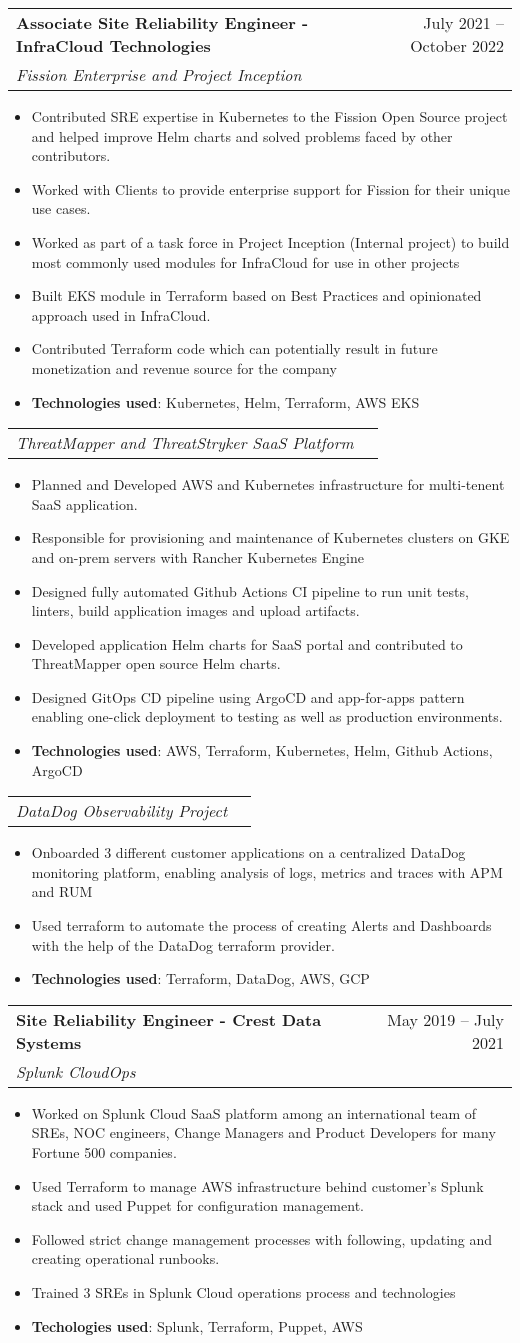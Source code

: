 \documentclass[letterpaper,11pt]{article}
\makeatletter
\newcommand{\resumeItem}[1]{
  \item\small{
    {#1 \vspace{-2pt}}
  }
}
\newcommand{\resumeSubheading}[4]{
  \vspace{-2pt}\item
    \begin{tabular*}{0.97\textwidth}[t]{l@{\extracolsep{\fill}}r}
      \textbf{#1} & #2 \\
      \textit{\small#3} & \textit{\small #4} \\
    \end{tabular*}\vspace{-7pt}
}
\newcommand{\resumeSubSubheading}[2]{
    \item
    \begin{tabular*}{0.97\textwidth}{l@{\extracolsep{\fill}}r}
      \textit{\small#1} & \textit{\small #2} \\
    \end{tabular*}\vspace{-7pt}
}
\newcommand{\resumeItemListStart}{\begin{itemize}}
\newcommand{\resumeItemListEnd}{\end{itemize}\vspace{-5pt}}
\makeatother
\begin{document}
    \resumeSubheading
      {Associate Site Reliability Engineer - InfraCloud Technologies}{July 2021 -- October 2022}
      {Fission Enterprise and Project Inception}{}
      \resumeItemListStart
        \resumeItem{Contributed SRE expertise in Kubernetes to the Fission Open Source project and helped improve Helm charts and solved problems faced by other contributors.}
        \resumeItem{Worked with Clients to provide enterprise support for Fission for their unique use cases.}
        \resumeItem{Worked as part of a task force in Project Inception (Internal project) to build most commonly used modules for InfraCloud for use in other projects}
        \resumeItem{Built EKS module in Terraform based on Best Practices and opinionated approach used in InfraCloud.}
        \resumeItem{Contributed Terraform code which can potentially result in future monetization and revenue source for the company}
        \resumeItem{\textbf{Technologies used}: Kubernetes, Helm, Terraform, AWS EKS}
    \resumeItemListEnd
    \resumeSubSubheading
     {ThreatMapper and ThreatStryker SaaS Platform}{}
     \resumeItemListStart
        \resumeItem{Planned and Developed AWS and Kubernetes infrastructure for multi-tenent SaaS application.}
        \resumeItem{Responsible for provisioning and maintenance of Kubernetes clusters on GKE and on-prem servers with Rancher Kubernetes Engine}
        \resumeItem{Designed fully automated Github Actions CI pipeline to run unit tests, linters, build application images and upload artifacts.}
        \resumeItem{Developed application Helm charts for SaaS portal and contributed to ThreatMapper open source Helm charts.}
        \resumeItem{Designed GitOps CD pipeline using ArgoCD and app-for-apps pattern enabling one-click deployment to testing as well as production environments.}
        \resumeItem{\textbf{Technologies used}: AWS, Terraform, Kubernetes, Helm, Github Actions, ArgoCD}
     \resumeItemListEnd
    \resumeSubSubheading
     {DataDog Observability Project}{}
     \resumeItemListStart
        \resumeItem{Onboarded 3 different customer applications on a centralized DataDog monitoring platform, enabling analysis of logs, metrics and traces with APM and RUM}
        \resumeItem{Used terraform to automate the process of creating Alerts and Dashboards with the help of the DataDog terraform provider.}
        \resumeItem{\textbf{Technologies used}: Terraform, DataDog, AWS, GCP}
     \resumeItemListEnd

    \resumeSubheading
      {Site Reliability Engineer - Crest Data Systems}{May 2019 -- July 2021}
      {Splunk CloudOps}{}
      \resumeItemListStart
        \resumeItem{Worked on Splunk Cloud SaaS platform among an international team of SREs, NOC engineers, Change Managers and Product Developers for many Fortune 500 companies.}
        \resumeItem{Used Terraform to manage AWS infrastructure behind customer's Splunk stack and used Puppet for configuration management.}
        \resumeItem{Followed strict change management processes with following, updating and creating operational runbooks.}
        \resumeItem{Trained 3 SREs in Splunk Cloud operations process and technologies}
        \resumeItem{\textbf{Techologies used}: Splunk, Terraform, Puppet, AWS}
      \resumeItemListEnd
    
\end{document}
